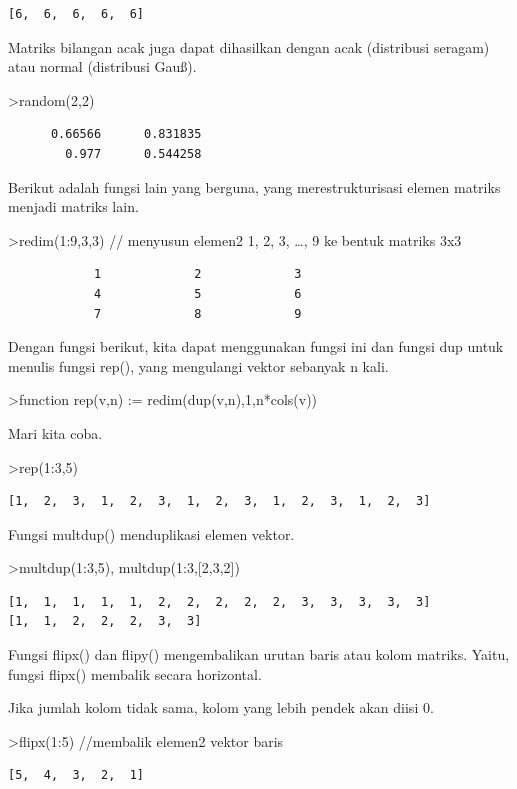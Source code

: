 \documentclass[
]{book}
\begin{document}
\begin{verbatim}
[6,  6,  6,  6,  6]
\end{verbatim}

Matriks bilangan acak juga dapat dihasilkan dengan acak (distribusi seragam) atau normal (distribusi Gauß).

\textgreater random(2,2)

\begin{verbatim}
      0.66566      0.831835 
        0.977      0.544258 
\end{verbatim}

Berikut adalah fungsi lain yang berguna, yang merestrukturisasi elemen matriks menjadi matriks lain.

\textgreater redim(1:9,3,3) // menyusun elemen2 1, 2, 3, \ldots, 9 ke bentuk matriks 3x3

\begin{verbatim}
            1             2             3 
            4             5             6 
            7             8             9 
\end{verbatim}

Dengan fungsi berikut, kita dapat menggunakan fungsi ini dan fungsi dup untuk menulis fungsi rep(), yang mengulangi vektor sebanyak n kali.

\textgreater function rep(v,n) := redim(dup(v,n),1,n*cols(v))

Mari kita coba.

\textgreater rep(1:3,5)

\begin{verbatim}
[1,  2,  3,  1,  2,  3,  1,  2,  3,  1,  2,  3,  1,  2,  3]
\end{verbatim}

Fungsi multdup() menduplikasi elemen vektor.

\textgreater multdup(1:3,5), multdup(1:3,{[}2,3,2{]})

\begin{verbatim}
[1,  1,  1,  1,  1,  2,  2,  2,  2,  2,  3,  3,  3,  3,  3]
[1,  1,  2,  2,  2,  3,  3]
\end{verbatim}

Fungsi flipx() dan flipy() mengembalikan urutan baris atau kolom matriks. Yaitu, fungsi flipx() membalik secara horizontal.

Jika jumlah kolom tidak sama, kolom yang lebih pendek akan diisi 0.

\textgreater flipx(1:5) //membalik elemen2 vektor baris

\begin{verbatim}
[5,  4,  3,  2,  1]
\end{verbatim}
\end{document}
